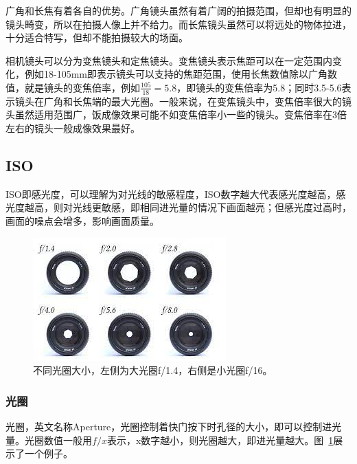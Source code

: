 \documentclass{ctexart}
\begin{document}
广角和长焦有着各自的优势。广角镜头虽然有着广阔的拍摄范围，但却也有明显的镜头畸变，所以在拍摄人像上并不给力。而长焦镜头虽然可以将远处的物体拉进，十分适合特写，但却不能拍摄较大的场面。

相机镜头可以分为变焦镜头和定焦镜头。变焦镜头表示焦距可以在一定范围内变化，例如18-105mm即表示镜头可以支持的焦距范围，使用长焦数值除以广角数值，就是镜头的变焦倍率，例如$\frac{105}{18}=5.8$，即镜头的变焦倍率为5.8；同时3.5-5.6表示镜头在广角和长焦端的最大光圈。一般来说，在变焦镜头中，变焦倍率很大的镜头虽然适用范围广，饭成像效果可能不如变焦倍率小一些的镜头。变焦倍率在3倍左右的镜头一般成像效果最好。

\subsection{ISO}
ISO即感光度，可以理解为对光线的敏感程度，ISO数字越大代表感光度越高，感光度越高，则对光线更敏感，即相同进光量的情况下画面越亮；但感光度过高时，画面的噪点会增多，影响画面质量。

\begin{figure}[h!]
    \centering
    \includegraphics[width=.8\linewidth]{imgs/aperture_size.jpg}
    \caption{不同光圈大小，左侧为大光圈f/1.4，右侧是小光圈f/16。}
    \label{fig_aperture_size}
\end{figure}

\subsubsection{光圈}
光圈，英文名称Aperture，光圈控制着快门按下时孔径的大小，即可以控制进光量。光圈数值一般用${f/x}$表示，x数字越小，则光圈越大，即进光量越大。图~\ref{fig_aperture_size}展示了一个例子。
\end{document}
